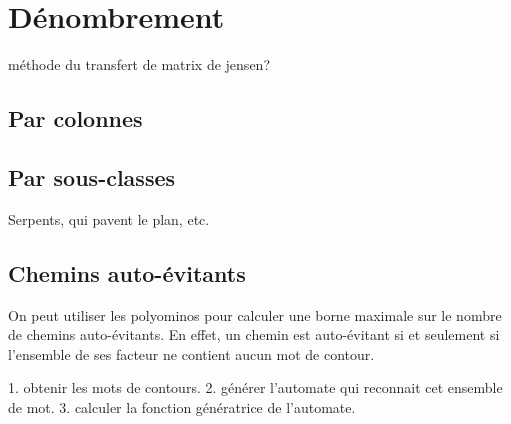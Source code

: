 \chapter{Dénombrement}\label{chapitre-denombrement}

méthode du transfert de matrix de jensen?
\section{Par colonnes}

\section{Par sous-classes}

Serpents, qui pavent le plan, etc.

\section{Chemins auto-évitants}

On peut utiliser les polyominos pour calculer une borne maximale sur le nombre de chemins auto-évitants. En effet, un chemin est auto-évitant si et seulement si l'ensemble de ses facteur ne contient aucun mot de contour.

1. obtenir les mots de contours.
2. générer l'automate qui reconnait cet ensemble de mot.
3. calculer la fonction génératrice de l'automate.

